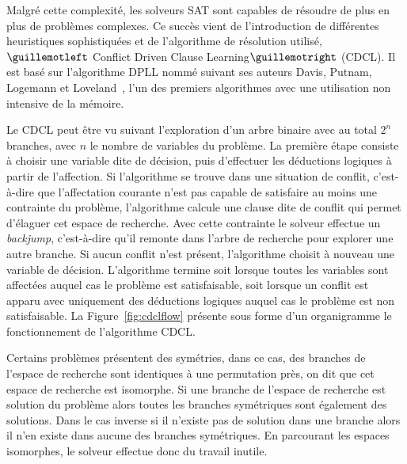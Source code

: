 Malgré cette complexité, les solveurs SAT sont capables de résoudre de plus en plus de problèmes complexes.
Ce succès vient de l'introduction de différentes heuristiques sophistiquées et de 
l'algorithme de résolution utilisé, $\guillemotleft$ Conflict Driven Clause Learning$\guillemotright$ (CDCL).
Il est basé sur l'algorithme DPLL nommé suivant ses auteurs Davis, Putnam, Logemann et Loveland~\cite{dpll_62},
l'un des premiers algorithmes avec une utilisation non intensive de la mémoire.

%
%
%

Le CDCL peut être vu suivant l'exploration d'un arbre binaire avec au total $2^n$ branches, avec $n$ le nombre de variables du problème.
La première étape consiste à choisir une variable dite de décision, puis d'effectuer les déductions logiques à partir de l'affection. 
Si l'algorithme se trouve dans une situation de conflit, c'est-à-dire que l'affectation courante n'est pas capable de satisfaire au moins une contrainte du problème, l'algorithme  calcule une clause dite de conflit qui permet d'élaguer 
cet espace de recherche. Avec cette contrainte le solveur effectue un \textit{backjump}, c'est-à-dire qu'il remonte dans l'arbre
de recherche pour explorer une autre branche.
Si aucun conflit n'est présent, l'algorithme choisit à nouveau une variable de décision. L'algorithme termine  soit lorsque toutes les variables sont affectées auquel cas le problème est satisfaisable, soit lorsque un conflit est apparu avec uniquement des déductions logiques auquel cas le
problème est non satisfaisable.
La Figure~\ref{fig:cdclflow} présente sous forme d'un organigramme le fonctionnement de l'algorithme CDCL.



Certains problèmes présentent des symétries, dans ce cas, des branches de l'espace de recherche 
sont identiques à une permutation près, on dit que cet espace de recherche est isomorphe.
Si une branche de l'espace de recherche est solution du problème alors toutes les branches symétriques
sont également des solutions. Dans le cas inverse si il n'existe pas de solution dans une branche alors il n'en
existe dans aucune des branches symétriques.
En parcourant les espaces isomorphes, le solveur effectue donc du travail inutile.

